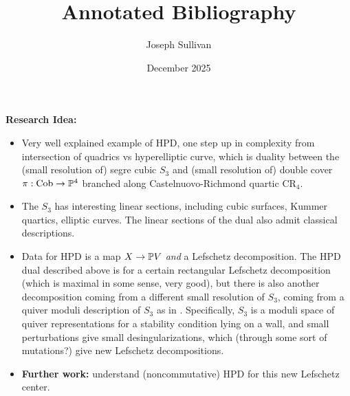 \documentclass[12pt]{article}
\title{Annotated Bibliography}
\author{Joseph Sullivan}
\date{December 2025}
\begin{document}
\maketitle

\textbf{Research Idea:}




\cite{Beckmann_Belmans_2022} 

\begin{itemize}
    \item Very well explained example of HPD, one step up in complexity from intersection of quadrics vs hyperelliptic curve, which is duality between the (small resolution of) segre cubic $S_3$ and (small resolution of) double cover $\pi: \mathrm{Cob} \to \P^4$ branched along Castelnuovo-Richmond quartic $\mathrm{CR}_4$.
    \item The $S_3$ has interesting linear sections, including cubic surfaces, Kummer quartics, elliptic curves. The linear sections of the dual also admit classical descriptions.
    \item Data for HPD is a map $X\to \P V$ \textit{and} a Lefschetz decomposition. The HPD dual described above is for a certain rectangular Lefschetz decomposition (which is maximal in some sense, very good), but there is also another decomposition coming from a different small resolution of $S_3$, coming from a quiver moduli description of $S_3$ as in \cite{Franzen_Reineke_Sabatini_2021}. Specifically, $S_3$ is a moduli space of quiver representations for a stability condition lying on a wall, and small perturbations give small desingularizations, which (through some sort of mutations?) give new Lefschetz decompositions.
    \item \textbf{Further work:} understand (noncommutative) HPD for this new Lefschetz center.
\end{itemize}

\cite{Belmans_Bose_Frei_Gould_Hotchkiss_Lamarche_Petok_Avila_Shah} 
\end{document}

